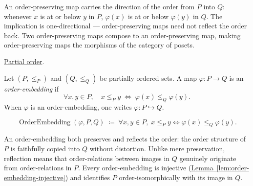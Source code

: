 \begin{remark*}[Interpretation]
An order-preserving map carries the direction of the order from $P$ into
$Q$: whenever $x$ is at or below $y$ in $P$, $\varphi(x)$ is at or below
$\varphi(y)$ in $Q$.  The implication is one-directional — order-preserving
maps need not reflect the order back.  Two order-preserving maps compose
to an order-preserving map, making order-preserving maps the morphisms
of the category of posets.
\end{remark*}

\begin{remark*}[Dependencies]
\hyperref[def:lattice-order-partial-order]{Partial order}.
\end{remark*}


\begin{tcolorbox}[colback=defbox, colframe=defborder, arc=2pt,
  left=6pt, right=6pt, top=4pt, bottom=4pt,
  title={\small\textbf{Definition (Order-Embedding)}},
  fonttitle=\small\bfseries]
\begin{definition}
\label{def:order-embedding}
Let $(P, \leq_P)$ and $(Q, \leq_Q)$ be partially ordered sets.  A map
$\varphi : P \to Q$ is an \emph{order-embedding} if
\[
\forall x, y \in P, \quad
x \leq_P y \;\Longleftrightarrow\; \varphi(x) \leq_Q \varphi(y).
\]
When $\varphi$ is an order-embedding, one writes $\varphi : P \hookrightarrow Q$.
\end{definition}
\end{tcolorbox}

\begin{remark*}
\[
\operatorname{OrderEmbedding}(\varphi, P, Q)
\;\coloneqq\;
\forall x, y \in P,\;
x \leq_P y \Longleftrightarrow \varphi(x) \leq_Q \varphi(y).
\]
\end{remark*}

\begin{remark*}[Interpretation]
An order-embedding both preserves and reflects the order: the order
structure of $P$ is faithfully copied into $Q$ without distortion.
Unlike mere preservation, reflection means that order-relations between
images in $Q$ genuinely originate from order-relations in $P$.  Every
order-embedding is injective
(\hyperref[lem:order-embedding-injective]{Lemma~\ref*{lem:order-embedding-injective}})
and identifies $P$ order-isomorphically with its image in $Q$.
\end{remark*}


